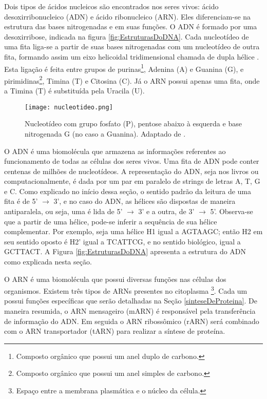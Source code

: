\indent Dois tipos de ácidos nucleicos são encontrados nos seres vivos: ácido desoxirribonucleico (ADN) e ácido ribonucleico (ARN). Eles diferenciam-se na estrutura das bases nitrogenadas e em suas funções. O ADN é formado por uma desoxirribose, indicada na figura \ref{fig:EstruturasDoDNA}. Cada nucleotídeo de uma fita liga-se a partir de suas bases nitrogenadas com um nucleotídeo de outra fita, formando assim um eixo helicoidal tridimensional chamada de dupla hélice \cite{setubal97}. Esta ligação é feita entre grupos de purinas\footnote{Composto orgânico que possui um anel duplo de carbono.}, Adenina (A) e Guanina (G), e pirimidinas\footnote{Composto orgânico que possui um anel simples de carbono.}, Timina (T) e Citosina (C). Já o ARN possui apenas uma fita, onde a Timina (T) é substituída pela Uracila (U).

\begin{figure}[h]
    \centering
    \texttt{[image: nucleotideo.png]}
    \caption{Nucleotídeo com grupo fosfato (P), pentose abaixo à esquerda e base nitrogenada G (no caso a Guanina). Adaptado de \cite{dnadiscovery08}. }
    \label{fig:Nucleotideo}
\end{figure} 

\indent O ADN é uma biomolécula que armazena as informações referentes ao funcionamento de todas as células dos seres vivos. Uma fita de ADN pode conter centenas de milhões de nucleotídeos. A representação do ADN, seja nos livros ou computacionalmente, é dada por um par em paralelo de strings de letras A, T, G e C. Como explicado no início dessa seção, o sentido padrão da leitura de uma fita é de 5' $\rightarrow$ 3', e no caso do ADN, as hélices são dispostas de maneira antiparalela, ou seja, uma é lida de 5' $\rightarrow$ 3' e a outra, de 3' $\rightarrow$ 5'. Observa-se que a partir de uma hélice, pode-se inferir a sequência de sua hélice complementar. Por exemplo, seja uma hélice H1 igual a AGTAAGC; então H2 em seu sentido oposto é H2' igual a TCATTCG, e no sentido biológico, igual a GCTTACT. A Figura \ref{fig:EstruturasDoDNA} apresenta a estrutura do ADN como explicada nesta seção.

\indent O ARN é uma biomolécula que possui diversas funções nas células dos organismos. Existem três tipos de ARNs presentes no citoplasma \footnote{Espaço entre a membrana plasmática e o núcleo da célula.}. Cada um possui funções específicas que serão detalhadas na Seção \ref{sinteseDeProteina}. De maneira resumida, o ARN mensageiro (mARN) é responsável pela transferência de informação do ADN. Em seguida o ARN ribossômico (rARN) será combinado com o ARN transportador (tARN) para realizar a síntese de proteína.

